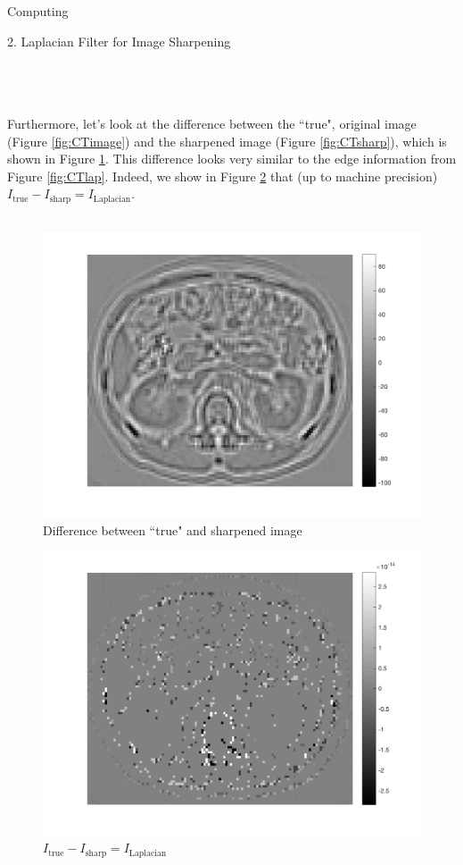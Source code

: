 \begin{section}{Computing}
\begin{homeworkSection}{2. Laplacian Filter for Image Sharpening}
{    \\
    \\
    \\
    Furthermore, let's look at the difference between the ``true", original image (Figure \ref{fig:CTimage}) and the sharpened image (Figure \ref{fig:CTsharp}), which is shown in Figure \ref{fig:CTdiff}. This difference looks very similar to the edge information from Figure \ref{fig:CTlap}. Indeed, we show in Figure \ref{fig:CTdiff_edge} that (up to machine precision) $I_{\text{true}} - I_{\text{sharp}} = I_{\text{Laplacian}}$. 
    \\
    \\
    \begin{minipage}{0.5\textwidth}
        \begin{figure}[H]
        \centering
        \includegraphics[trim={0cm 1.5cm 1cm 0.5cm},clip,width=0.8\columnwidth]{../data/CTdiff}
        \caption{Difference between ``true" and sharpened image}
        \label{fig:CTdiff}
        \end{figure}
    \end{minipage}
    \begin{minipage}{0.5\textwidth}
        \begin{figure}[H]
        \centering
        \includegraphics[trim={0cm 1.5cm 1cm 0.5cm},clip,width=0.8\columnwidth]{../data/CTdiff_edge}
        \caption{ $I_{\text{true}} - I_{\text{sharp}} = I_{\text{Laplacian}}$ }
        \label{fig:CTdiff_edge}
        \end{figure}
    \end{minipage}}
\end{homeworkSection}


\end{section}
